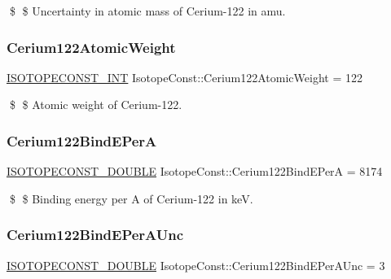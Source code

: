 \$ \$ Uncertainty in atomic mass of Cerium-\/122 in amu. \mbox{\label{group___isotope_const-_cerium-_ce122_gaf906fae92e5417387552141556796959}} 
\subsubsection{\texorpdfstring{Cerium122\+Atomic\+Weight}{Cerium122AtomicWeight}}
{\footnotesize\ttfamily \mbox{\hyperlink{group___isotope_const-_macros_ga5f18360b3e99483a35c32d789e62621c}{I\+S\+O\+T\+O\+P\+E\+C\+O\+N\+S\+T\+\_\+\+I\+NT}} Isotope\+Const\+::\+Cerium122\+Atomic\+Weight = 122}

\$ \$ Atomic weight of Cerium-\/122. \mbox{\label{group___isotope_const-_cerium-_ce122_gae554ee4abda0ac634f00bca3c4128330}} 
\subsubsection{\texorpdfstring{Cerium122\+Bind\+E\+PerA}{Cerium122BindEPerA}}
{\footnotesize\ttfamily \mbox{\hyperlink{group___isotope_const-_macros_ga8f45a7272ce02c0b4c65c44636ed719a}{I\+S\+O\+T\+O\+P\+E\+C\+O\+N\+S\+T\+\_\+\+D\+O\+U\+B\+LE}} Isotope\+Const\+::\+Cerium122\+Bind\+E\+PerA = 8174}

\$ \$ Binding energy per A of Cerium-\/122 in keV. \mbox{\label{group___isotope_const-_cerium-_ce122_gaa204e04f6ae19364f45650cab92766f1}} 
\subsubsection{\texorpdfstring{Cerium122\+Bind\+E\+Per\+A\+Unc}{Cerium122BindEPerAUnc}}
{\footnotesize\ttfamily \mbox{\hyperlink{group___isotope_const-_macros_ga8f45a7272ce02c0b4c65c44636ed719a}{I\+S\+O\+T\+O\+P\+E\+C\+O\+N\+S\+T\+\_\+\+D\+O\+U\+B\+LE}} Isotope\+Const\+::\+Cerium122\+Bind\+E\+Per\+A\+Unc = 3}

